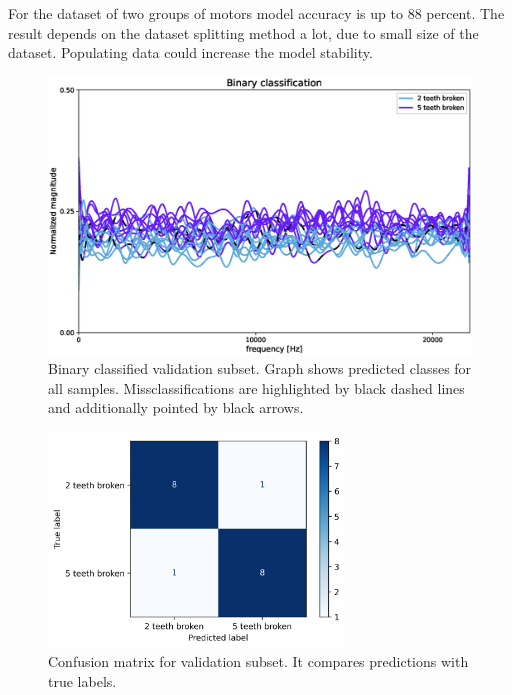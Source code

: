 \documentclass[energies,article,submit,pdftex,moreauthors]{Definitions/mdpi}
\begin{document}
For the dataset of two groups of motors model accuracy is up to 88 percent. The result depends on the dataset splitting method a lot, due to small size of the dataset. Populating data could increase the model stability. 

\begin{figure}[H]
\includegraphics[width=\textwidth]{images/binary_classification}
\caption{Binary classified validation subset. Graph shows predicted classes for all samples. Missclassifications are highlighted by black dashed lines and additionally pointed by black arrows.}
\end{figure}
\unskip
\vspace{5mm}

\begin{figure}[H]
\centering
\includegraphics[width=0.7\textwidth]{images/confusion_matrix}
\caption{Confusion matrix for validation subset. It compares predictions with true labels.}
\end{figure}
\unskip
\vspace{5mm}

\end{document}

